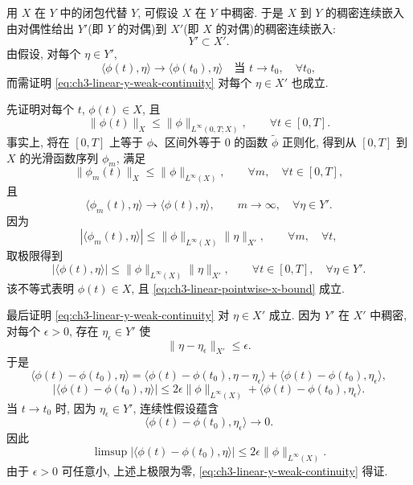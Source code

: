 \begin{Proof}
用 $X$ 在 $Y$ 中的闭包代替 $Y$, 可假设 $X$ 在 $Y$ 中稠密. 于是 $X$ 到 $Y$ 的稠密连续嵌入由对偶性给出 $Y'$(即 $Y$ 的对偶)到 $X'$(即 $X$ 的对偶)的稠密连续嵌入:
\begin{equation}
Y'\subset X'.
\label{eq:ch3-linear-dual-dense-injection}
\end{equation}
由假设, 对每个 $\eta\in Y'$,
\begin{equation}
\langle\phi(t),\eta\rangle\longrightarrow\langle\phi(t_0),\eta\rangle
\quad\text{当 }t\to t_0,\quad\forall t_0,
\label{eq:ch3-linear-y-weak-continuity}
\end{equation}
而需证明 \eqref{eq:ch3-linear-y-weak-continuity} 对每个 $\eta\in X'$ 也成立.

先证明对每个 $t$, $\phi(t)\in X$, 且
\begin{equation}
\lVert\phi(t)\rVert_X\leq\lVert\phi\rVert_{L^\infty(0,T;X)},
\qquad\forall t\in[0,T].
\label{eq:ch3-linear-pointwise-x-bound}
\end{equation}
事实上, 将在 $[0,T]$ 上等于 $\phi$、区间外等于 $0$ 的函数 $\widetilde\phi$ 正则化, 得到从 $[0,T]$ 到 $X$ 的光滑函数序列 $\phi_m$, 满足
\[
\lVert\phi_m(t)\rVert_X\leq\lVert\phi\rVert_{L^\infty(X)},
\qquad\forall m,\quad\forall t\in[0,T],
\]
且
\[
\langle\phi_m(t),\eta\rangle\longrightarrow\langle\phi(t),\eta\rangle,
\qquad m\to\infty,\quad\forall\eta\in Y'.
\]
因为
\[
|\langle\phi_m(t),\eta\rangle|
\leq\lVert\phi\rVert_{L^\infty(X)}\lVert\eta\rVert_{X'},
\qquad\forall m,\quad\forall t,
\]
取极限得到
\[
|\langle\phi(t),\eta\rangle|
\leq\lVert\phi\rVert_{L^\infty(X)}\lVert\eta\rVert_{X'},
\qquad\forall t\in[0,T],\quad\forall\eta\in Y'.
\]
该不等式表明 $\phi(t)\in X$, 且 \eqref{eq:ch3-linear-pointwise-x-bound} 成立.

\hypertarget{chapter-03-page-194}{}
最后证明 \eqref{eq:ch3-linear-y-weak-continuity} 对 $\eta\in X'$ 成立. 因为 $Y'$ 在 $X'$ 中稠密, 对每个 $\epsilon>0$, 存在 $\eta_\epsilon\in Y'$ 使
\[
\lVert\eta-\eta_\epsilon\rVert_{X'}\leq\epsilon.
\]
于是
\[
\langle\phi(t)-\phi(t_0),\eta\rangle
=\langle\phi(t)-\phi(t_0),\eta-\eta_\epsilon\rangle
+\langle\phi(t)-\phi(t_0),\eta_\epsilon\rangle,
\]
\[
|\langle\phi(t)-\phi(t_0),\eta\rangle|
\leq2\epsilon\lVert\phi\rVert_{L^\infty(X)}
+\langle\phi(t)-\phi(t_0),\eta_\epsilon\rangle.
\]
当 $t\to t_0$ 时, 因为 $\eta_\epsilon\in Y'$, 连续性假设蕴含
\[
\langle\phi(t)-\phi(t_0),\eta_\epsilon\rangle\longrightarrow0.
\]
因此
\[
\limsup|\langle\phi(t)-\phi(t_0),\eta\rangle|
\leq2\epsilon\lVert\phi\rVert_{L^\infty(X)}.
\]
由于 $\epsilon>0$ 可任意小, 上述上极限为零, \eqref{eq:ch3-linear-y-weak-continuity} 得证.
\end{Proof}
